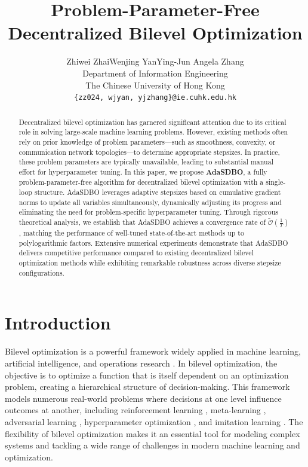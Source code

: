 \documentclass{article}
\title{Problem-Parameter-Free \\ Decentralized Bilevel Optimization}
\author{
  Zhiwei Zhai\quad Wenjing Yan\quad Ying-Jun Angela Zhang \\
  Department of Information Engineering\\
  The Chinese University of Hong Kong\\
  \texttt{\{zz024, wjyan, yjzhang\}@ie.cuhk.edu.hk} \\
}
\theoremstyle{plain}
\theoremstyle{definition}
\theoremstyle{remark}
\def\w#1{\widetilde{#1}}
\begin{document}
\maketitle

\begin{abstract}
Decentralized bilevel optimization has garnered significant attention due to its critical role in solving large-scale machine learning problems. However, existing methods often rely on prior knowledge of problem parameters—such as smoothness, convexity, or communication network topologies—to determine appropriate stepsizes. In practice, these problem parameters are typically unavailable, leading to substantial manual effort for hyperparameter tuning. In this paper, we propose \textbf{AdaSDBO}, a fully problem-parameter-free algorithm for decentralized bilevel optimization with a single-loop structure. AdaSDBO leverages adaptive stepsizes based on cumulative gradient norms to update all variables simultaneously, dynamically adjusting its progress and eliminating the need for problem-specific hyperparameter tuning. Through rigorous theoretical analysis, we establish that AdaSDBO achieves a convergence rate of $\w{\mathcal{O}}\left(\frac{1}{T}\right)$, matching the performance of well-tuned state-of-the-art methods up to polylogarithmic factors. Extensive numerical experiments demonstrate that AdaSDBO delivers competitive performance compared to existing decentralized bilevel optimization methods while exhibiting remarkable robustness across diverse stepsize configurations.
\end{abstract}

\section{Introduction}
\vspace{-0.15cm}

Bilevel optimization is a powerful framework widely applied in machine learning, artificial intelligence, and operations research \citep{camacho2024metaheuristics, caselli2024bilevel}. In bilevel optimization, the objective is to optimize a function that is itself dependent on an optimization problem, creating a hierarchical structure of decision-making. This framework models numerous real-world problems where decisions at one level influence outcomes at another, including reinforcement learning \citep{hong2023two, thoma2024contextual, shen2025principled}, meta-learning \citep{bertinetto2018meta, rajeswaran2019meta, ji2020convergence}, adversarial learning \citep{mkadry2017towards}, hyperparameter optimization \citep{pedregosa2016hyperparameter, franceschi2018bilevel}, and imitation learning \citep{arora2020provable}. The flexibility of bilevel optimization makes it an essential tool for modeling complex systems and tackling a wide range of challenges in modern machine learning and optimization.
\end{document}
